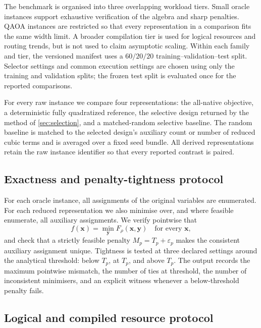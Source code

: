 \documentclass[a4paper,onecolumn,11pt,unpublished]{quantumarticle}
\theoremstyle{remark}
\begin{document}
The benchmark is organised into three overlapping workload tiers.  Small
oracle instances support exhaustive verification of the algebra and sharp
penalties.  QAOA instances are restricted so that every representation in a
comparison fits the same width limit.  A broader compilation tier is used for
logical resources and routing trends, but is not used to claim asymptotic
scaling.  Within each family and tier, the versioned manifest uses a
$60/20/20$ training--validation--test split.  Selector settings and common
execution settings are chosen using only the training and validation splits;
the frozen test split is evaluated once for the reported comparisons.

For every raw instance we compare four representations: the all-native
objective, a deterministic fully quadratized reference, the selective design
returned by the method of \cref{sec:selection}, and a matched-random selective
baseline.  The random baseline is matched to the selected design's auxiliary
count or number of reduced cubic terms and is averaged over a fixed seed
bundle.  All derived representations retain the raw instance identifier so
that every reported contrast is paired.

\subsection{Exactness and penalty-tightness protocol}
\label{sec:exactness-protocol}

For each oracle instance, all assignments of the original variables are
enumerated.  For each reduced representation we also minimise over, and where
feasible enumerate, all auxiliary assignments.  We verify pointwise that
\begin{equation}
  f(\bm x)=\min_{\bm y}F_{\rho}(\bm x,\bm y)
  \quad\text{for every }\bm x,
  \label{eq:experimental-pointwise-check}
\end{equation}
and check that a strictly feasible penalty $M_p=T_p+\varepsilon_p$ makes the
consistent auxiliary assignment unique.  Tightness is tested at three declared
settings around the analytical threshold: below $T_p$, at $T_p$, and above
$T_p$.  The output records the maximum pointwise mismatch, the number of ties
at threshold, the number of inconsistent minimisers, and an explicit witness
whenever a below-threshold penalty fails.

\subsection{Logical and compiled resource protocol}
\label{sec:resource-protocol}
\end{document}
